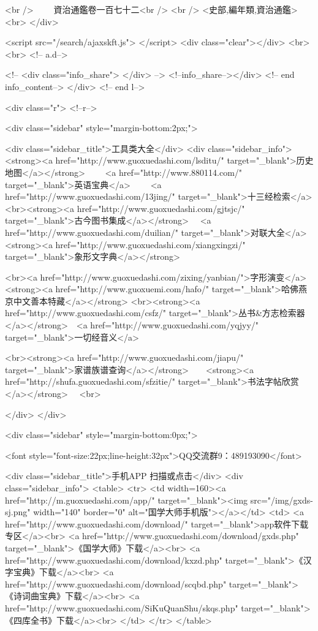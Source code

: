 <br />
　　資治通鑑卷一百七十二<br />
<br />
<史部,編年類,資治通鑑>  <br>
   </div> 

<script src="/search/ajaxskft.js"> </script>
 <div class="clear"></div>
<br>
<br>
 <!-- a.d-->

 <!--
<div class="info_share">
</div> 
-->
 <!--info_share--></div>   <!-- end info_content-->
  </div> <!-- end l-->

<div class="r">   <!--r-->



<div class="sidebar"  style="margin-bottom:2px;">

 
<div class="sidebar_title">工具类大全</div>
<div class="sidebar_info">
<strong><a href="http://www.guoxuedashi.com/lsditu/" target="_blank">历史地图</a></strong>　　
<a href="http://www.880114.com/" target="_blank">英语宝典</a>　　
<a href="http://www.guoxuedashi.com/13jing/" target="_blank">十三经检索</a>　
<br><strong><a href="http://www.guoxuedashi.com/gjtsjc/" target="_blank">古今图书集成</a></strong>　
<a href="http://www.guoxuedashi.com/duilian/" target="_blank">对联大全</a>　<strong><a href="http://www.guoxuedashi.com/xiangxingzi/" target="_blank">象形文字典</a></strong>　

<br><a href="http://www.guoxuedashi.com/zixing/yanbian/">字形演变</a>　　<strong><a href="http://www.guoxuemi.com/hafo/" target="_blank">哈佛燕京中文善本特藏</a></strong>
<br><strong><a href="http://www.guoxuedashi.com/csfz/" target="_blank">丛书&方志检索器</a></strong>　<a href="http://www.guoxuedashi.com/yqjyy/" target="_blank">一切经音义</a>　　

<br><strong><a href="http://www.guoxuedashi.com/jiapu/" target="_blank">家谱族谱查询</a></strong>　　<strong><a href="http://shufa.guoxuedashi.com/sfzitie/" target="_blank">书法字帖欣赏</a></strong>　
<br>

</div>
</div>


<div class="sidebar" style="margin-bottom:0px;">

<font style="font-size:22px;line-height:32px">QQ交流群9：489193090</font>


<div class="sidebar_title">手机APP 扫描或点击</div>
<div class="sidebar_info">
<table>
<tr>
	<td width=160><a href="http://m.guoxuedashi.com/app/" target="_blank"><img src="/img/gxds-sj.png" width="140"  border="0" alt="国学大师手机版"></a></td>
	<td>
<a href="http://www.guoxuedashi.com/download/" target="_blank">app软件下载专区</a><br>
<a href="http://www.guoxuedashi.com/download/gxds.php" target="_blank">《国学大师》下载</a><br>
<a href="http://www.guoxuedashi.com/download/kxzd.php" target="_blank">《汉字宝典》下载</a><br>
<a href="http://www.guoxuedashi.com/download/scqbd.php" target="_blank">《诗词曲宝典》下载</a><br>
<a href="http://www.guoxuedashi.com/SiKuQuanShu/skqs.php" target="_blank">《四库全书》下载</a><br>
</td>
</tr>
</table>

